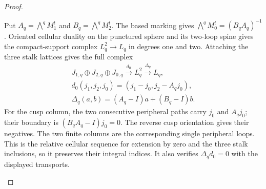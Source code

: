 \begin{proof}
\begin{enumerate}[label=\arabic*.,leftmargin=*]
Put $A_q=\bigwedge^qM_1^t$ and $B_q=\bigwedge^qM_2^t$.
The based marking gives
$\bigwedge^qM_0^t=(B_qA_q)^{-1}$.
Oriented cellular duality on the punctured sphere and its two-loop
spine gives the compact-support complex $L_q^2\to L_q$ in degrees
one and two.  Attaching the three stalk lattices gives the full complex
\[
\begin{gathered}
 J_{1,q}\oplus J_{2,q}\oplus J_{0,q}
 \xrightarrow{d_0}L_q^2\xrightarrow{\Delta_q}L_q,\\
 d_0(j_1,j_2,j_0)=(j_1-j_0,j_2-A_qj_0),\\
 \Delta_q(a,b)=(A_q-I)a+(B_q-I)b.
\end{gathered}
\]
For the cusp column, the two consecutive peripheral paths carry
$j_0$ and $A_qj_0$; their boundary is
$(B_qA_q-I)j_0=0$.  The reverse cusp orientation gives their negatives.
The two finite columns are the corresponding single peripheral
loops.  This is the relative cellular sequence for extension by zero
and the three stalk inclusions, so it preserves their integral indices.
It also verifies $\Delta_qd_0=0$ with the displayed transports.


\end{enumerate}
\end{proof}
